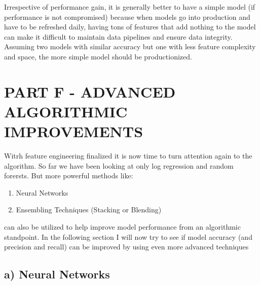 \documentclass[11pt]{article}
\providecommand{\tightlist}{%
      \setlength{\itemsep}{0pt}\setlength{\parskip}{0pt}}
\begin{document}
Irrespective of performance gain, it is generally better to have a
simple model (if performance is not compromised) because when models go
into production and have to be refreshed daily, having tons of features
that add nothing to the model can make it difficult to maintain data
pipelines and ensure data integrity. Assuming two models with similar
accuracy but one with less feature complexity and space, the more simple
model should be productionized.

    \section{PART F - ADVANCED ALGORITHMIC
IMPROVEMENTS}\label{part-f---advanced-algorithmic-improvements}

Witrh feature engineering finalized it is now time to turn attention
again to the algorithm. So far we have been looking at only log
regression and random forersts. But more powerful methods like:

\begin{enumerate}
\def\labelenumi{\arabic{enumi})}
\tightlist
\item
  Neural Networks
\item
  Ensembling Techniques (Stacking or Blending)
\end{enumerate}

can also be utilized to help improve model performance from an
algorithmic standpoint. In the following section I will now try to see
if model accuracy (and precision and recall) can be improved by using
even more advanced techniques

\subsection{a) Neural Networks}\label{a-neural-networks}
\end{document}
